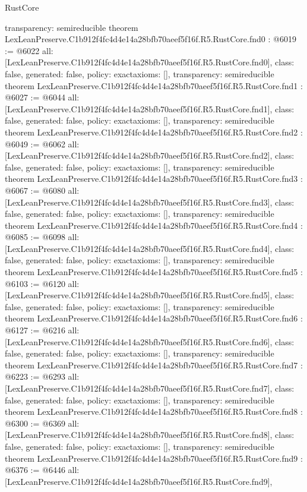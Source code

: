 \begin{lexlean}{RustCore}
\begin{coremodule}
{  transparency: semireducible
}
theorem LexLeanPreserve.C1b912f4fc4d4e14a28bfb70aeef5f16f.R5.RustCore.fnd0 : @6019 := @6022 {
  all: [LexLeanPreserve.C1b912f4fc4d4e14a28bfb70aeef5f16f.R5.RustCore.fnd0],
  class: false,
  generated: false,
  policy: exact{axioms: []},
  transparency: semireducible
}
theorem LexLeanPreserve.C1b912f4fc4d4e14a28bfb70aeef5f16f.R5.RustCore.fnd1 : @6027 := @6044 {
  all: [LexLeanPreserve.C1b912f4fc4d4e14a28bfb70aeef5f16f.R5.RustCore.fnd1],
  class: false,
  generated: false,
  policy: exact{axioms: []},
  transparency: semireducible
}
theorem LexLeanPreserve.C1b912f4fc4d4e14a28bfb70aeef5f16f.R5.RustCore.fnd2 : @6049 := @6062 {
  all: [LexLeanPreserve.C1b912f4fc4d4e14a28bfb70aeef5f16f.R5.RustCore.fnd2],
  class: false,
  generated: false,
  policy: exact{axioms: []},
  transparency: semireducible
}
theorem LexLeanPreserve.C1b912f4fc4d4e14a28bfb70aeef5f16f.R5.RustCore.fnd3 : @6067 := @6080 {
  all: [LexLeanPreserve.C1b912f4fc4d4e14a28bfb70aeef5f16f.R5.RustCore.fnd3],
  class: false,
  generated: false,
  policy: exact{axioms: []},
  transparency: semireducible
}
theorem LexLeanPreserve.C1b912f4fc4d4e14a28bfb70aeef5f16f.R5.RustCore.fnd4 : @6085 := @6098 {
  all: [LexLeanPreserve.C1b912f4fc4d4e14a28bfb70aeef5f16f.R5.RustCore.fnd4],
  class: false,
  generated: false,
  policy: exact{axioms: []},
  transparency: semireducible
}
theorem LexLeanPreserve.C1b912f4fc4d4e14a28bfb70aeef5f16f.R5.RustCore.fnd5 : @6103 := @6120 {
  all: [LexLeanPreserve.C1b912f4fc4d4e14a28bfb70aeef5f16f.R5.RustCore.fnd5],
  class: false,
  generated: false,
  policy: exact{axioms: []},
  transparency: semireducible
}
theorem LexLeanPreserve.C1b912f4fc4d4e14a28bfb70aeef5f16f.R5.RustCore.fnd6 : @6127 := @6216 {
  all: [LexLeanPreserve.C1b912f4fc4d4e14a28bfb70aeef5f16f.R5.RustCore.fnd6],
  class: false,
  generated: false,
  policy: exact{axioms: []},
  transparency: semireducible
}
theorem LexLeanPreserve.C1b912f4fc4d4e14a28bfb70aeef5f16f.R5.RustCore.fnd7 : @6223 := @6293 {
  all: [LexLeanPreserve.C1b912f4fc4d4e14a28bfb70aeef5f16f.R5.RustCore.fnd7],
  class: false,
  generated: false,
  policy: exact{axioms: []},
  transparency: semireducible
}
theorem LexLeanPreserve.C1b912f4fc4d4e14a28bfb70aeef5f16f.R5.RustCore.fnd8 : @6300 := @6369 {
  all: [LexLeanPreserve.C1b912f4fc4d4e14a28bfb70aeef5f16f.R5.RustCore.fnd8],
  class: false,
  generated: false,
  policy: exact{axioms: []},
  transparency: semireducible
}
theorem LexLeanPreserve.C1b912f4fc4d4e14a28bfb70aeef5f16f.R5.RustCore.fnd9 : @6376 := @6446 {
  all: [LexLeanPreserve.C1b912f4fc4d4e14a28bfb70aeef5f16f.R5.RustCore.fnd9],
}
\end{coremodule}
\end{lexlean}
